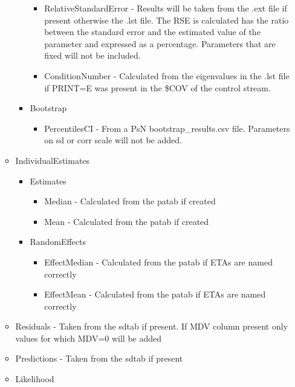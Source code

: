 \begin{itemize}
\begin{itemize}
\begin{itemize}
\begin{itemize}
                    \item RelativeStandardError - Results will be taken from the .ext file if present otherwise the .lst file. The RSE is calculated has the ratio between the standard error and the estimated value of the parameter and expressed as a percentage. Parameters that are fixed will not be included.
                    \item ConditionNumber - Calculated from the eigenvalues in the .lst file if PRINT=E was present in the \$COV of the control stream.
                \end{itemize}
                \item Bootstrap
                \begin{itemize}
                    \item PercentilesCI - From a PsN bootstrap\_results.csv file. Parameters on sd or corr scale will not be added.
                \end{itemize}
            \end{itemize}
            \item IndividualEstimates
            \begin{itemize}
                \item Estimates
                \begin{itemize}
                    \item Median - Calculated from the patab if created
                    \item Mean - Calculated from the patab if created
                \end{itemize}
                \item RandomEffects
                \begin{itemize}
                    \item EffectMedian - Calculated from the patab if ETAs are named correctly
                    \item EffectMean - Calculated from the patab if ETAs are named correctly
                \end{itemize}
            \end{itemize}
            \item Residuals - Taken from the sdtab if present. If MDV column present only values for which MDV=0 will be added
            \item Predictions - Taken from the sdtab if present
            \item Likelihood
                \begin{itemize}

\end{itemize}
\end{itemize}
\end{itemize}
